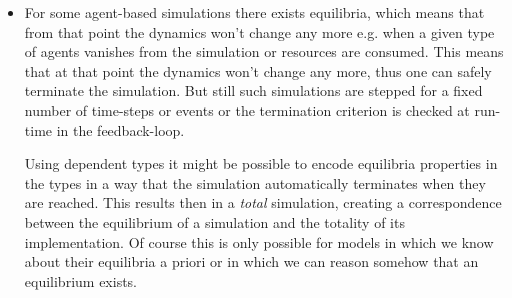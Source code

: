 \begin{itemize}
	
	
	\item For some agent-based simulations there exists equilibria, which means that from that point the dynamics won't change any more e.g. when a given type of agents vanishes from the simulation or resources are consumed. This means that at that point the dynamics won't change any more, thus one can safely terminate the simulation. But still such simulations are stepped for a fixed number of time-steps or events or the termination criterion is checked at run-time in the feedback-loop. 
	
	Using dependent types it might be possible to encode equilibria properties in the types in a way that the simulation automatically terminates when they are reached. This results then in a \textit{total} simulation, creating a correspondence between the equilibrium of a simulation and the totality of its implementation. Of course this is only possible for models in which we know about their equilibria a priori or in which we can reason somehow that an equilibrium exists.
\end{itemize}



